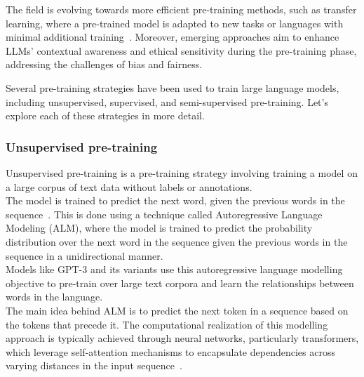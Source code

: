The field is evolving towards more efficient pre-training methods, such as transfer learning, where a pre-trained model is adapted to new tasks or languages with minimal additional training~\cite{ruder2019transfer}.
Moreover, emerging approaches aim to enhance LLMs' contextual awareness and ethical sensitivity during the pre-training phase, addressing the challenges of bias and fairness.

\label{subsec:pre-training-strategies}

Several pre-training strategies have been used to train large language models, including unsupervised, supervised, and semi-supervised pre-training.
Let's explore each of these strategies in more detail.

\subsubsection{Unsupervised pre-training}
\label{subsubsec:unsupervised-pre-training}

Unsupervised pre-training is a pre-training strategy involving training a model on a large corpus of text data without labels or annotations.\\
The model is trained to predict the next word, given the previous words in the sequence~\cite{brown2020language}.
This is done using a technique called Autoregressive Language Modeling (ALM), where the model is trained to predict the probability distribution over the next word in the sequence given the previous words in the sequence in a unidirectional manner.\\
Models like GPT-3 and its variants use this autoregressive language modelling objective to pre-train over large text corpora and learn the relationships between words in the language.\\
The main idea behind ALM is to predict the next token in a sequence based on the tokens that precede it.
The computational realization of this modelling approach is typically achieved through neural networks, particularly transformers, which leverage self-attention mechanisms to encapsulate dependencies across varying distances in the input sequence~\cite{vaswani2023attention}.

